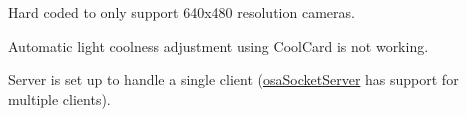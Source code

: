 
\begin{DoxyRefList}
\item[\label{bug__bug000001}%
\hypertarget{bug__bug000001}{}%
File \hyperlink{mts_micron_tracker_8h}{mts\+Micron\+Tracker.h} ]Hard coded to only support 640x480 resolution cameras. 

Automatic light coolness adjustment using Cool\+Card is not working. 
\item[\label{bug__bug000002}%
\hypertarget{bug__bug000002}{}%
File \hyperlink{mts_open_i_g_t_link_8h}{mts\+Open\+I\+G\+T\+Link.h} ]Server is set up to handle a single client (\hyperlink{classosa_socket_server}{osa\+Socket\+Server} has support for multiple clients).
\end{DoxyRefList}